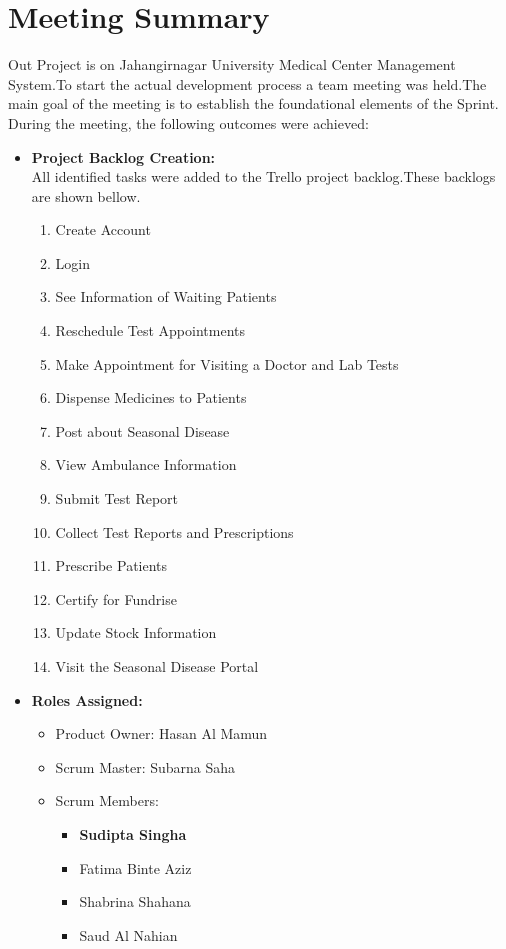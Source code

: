 \documentclass[a4paper,12pt]{article}
\begin{document}
\section{Meeting Summary}
Out Project is on Jahangirnagar University Medical Center Management System.To start the actual development
process
a team meeting was held.The main goal of the meeting is to establish the foundational elements of the Sprint. During the meeting, the following outcomes were achieved:
\begin{itemize}
    \item \textbf{Project Backlog Creation:}\\All identified tasks were added to the Trello project
        backlog.These backlogs are shown bellow.
        \begin{enumerate}
            \item Create Account
            \item Login
            \item See Information of Waiting Patients
            \item Reschedule Test Appointments
            \item Make Appointment for Visiting a Doctor and Lab Tests
            \item Dispense Medicines to Patients
            \item Post about Seasonal Disease
            \item View Ambulance Information
            \item Submit Test Report
            \item Collect Test Reports and Prescriptions
            \item Prescribe Patients
            \item Certify for Fundrise
            \item Update Stock Information
            \item Visit the Seasonal Disease Portal
        \end{enumerate}
    \item \textbf{Roles Assigned:}
        \begin{itemize}
            \item Product Owner: Hasan Al Mamun
            \item Scrum Master: Subarna Saha
            \item Scrum Members: 
                \begin{itemize}
                    \item \textbf{Sudipta Singha}
                    \item Fatima Binte Aziz
                    \item Shabrina Shahana
                    \item Saud Al Nahian


\end{itemize}
\end{itemize}
\end{itemize}
\end{document}
